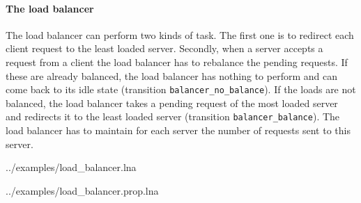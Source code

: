 \paragraph{The load balancer}
The load balancer can perform two kinds of task. The first one is to
redirect each client request to the least loaded server. Secondly,
when a server accepts a request from a client the load balancer has to
rebalance the pending requests. If these are already balanced, the
load balancer has nothing to perform and can come back to its idle
state (transition \lstinline{balancer_no_balance}). If the loads are
not balanced, the load balancer takes a pending request of the most
loaded server and redirects it to the least loaded server (transition
\lstinline{balancer_balance}).   The load balancer has to maintain for
each server the number of requests sent to this server.

 {../examples/load_balancer.lna}

 {../examples/load_balancer.prop.lna}
